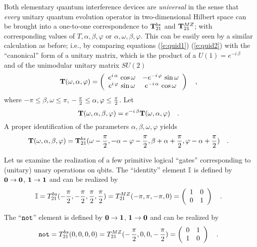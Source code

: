 Both elementary quantum interference devices are {\em universal} in the
sense that
{\em every} unitary quantum
evolution operator in two-dimensional Hilbert space can be brought into
a one-to-one correspondence to  ${\bf T}^{bs}_{21}$ and
${\bf T}^{MZ}_{21}$; with corresponding values of
$T,\alpha ,\beta ,\varphi$ or
$\alpha ,\omega ,\beta ,\varphi $.
This can be easily seen by a similar calculation as before; i.e., by
comparing
equations
(\ref{e:quid1})
(\ref{e:quid2}) with the ``canonical''  form of a unitary matrix, which
is the product of a $U(1)=e^{-i\,\beta}$ and
 of the unimodular unitary
matrix $SU(2)$ \cite{murnaghan}
\begin{equation}
{\bf T} (\omega ,\alpha ,\varphi )=
\left(
\begin{array}{cc}
{e^{i\,\alpha }}\,\cos \omega
&
{-e^{-i\,\varphi }}\,\sin \omega
\\
{e^{i\,\varphi }}\,\sin \omega
&
{e^{-i\,\alpha }}\,\cos \omega
 \end{array}
\right)
 \quad ,
\end{equation}
where $-\pi \le \beta ,\omega \le \pi$,
$-\, {\pi \over 2} \le  \alpha ,\varphi \le {\pi \over 2}$.
Let
\begin{equation}
{\bf T} (\omega ,\alpha ,\beta ,\varphi )=
e^{-i\,\beta}{\bf T} (\omega ,\alpha ,\varphi )
\quad .
\end{equation}
A proper identification of the parameters
$\alpha ,\beta ,\omega ,\varphi $ yields
\begin{equation}
{\bf T} (\omega ,\alpha ,\beta ,\varphi )=
{\bf T}_{21}^{bs} (\omega -{\pi \over 2} ,-\alpha -\varphi -{\pi \over
2},
\beta + \alpha  +{\pi  \over 2} ,\varphi -\alpha +{\pi \over 2}
)
\quad .
\end{equation}


Let us examine the realization of a few primitive logical ``gates''
corresponding to (unitary) unary operations on qbits.
The ``identity'' element ${\Bbb I}$ is defined by
$ {\bf 0}  \rightarrow   {\bf 0} $,
$ {\bf 1}  \rightarrow   {\bf 1} $ and can be realized by
\begin{equation}
{\Bbb I} =
T^{bs}_{21}(-{\pi \over 2},-{\pi \over 2},{\pi \over 2},{\pi \over 2})=
T^{MZ}_{21}(-\pi ,\pi ,-\pi ,0)
=
\left(
\begin{array}{cc}
1&0
\\
0&1
 \end{array}
\right)
\quad .
\end{equation}

The ``${\tt not}$'' element is defined by
$ {\bf 0}  \rightarrow   {\bf 1} $,
$ {\bf 1}  \rightarrow   {\bf 0} $ and can be realized by
\begin{equation}
{\tt not} =
T^{bs}_{21}(0,0,0,0)=
T^{MZ}_{21}(-\,{\pi \over 2},0,0,-\,{\pi \over 2})
=
\left(
\begin{array}{cc}
0&1
\\
1&0
 \end{array}
\right)
\quad .
\end{equation}


